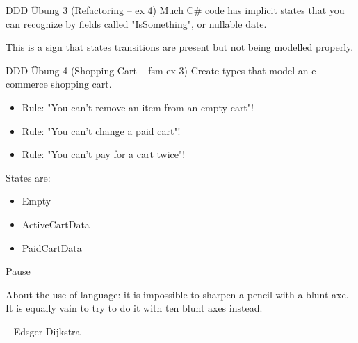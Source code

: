 \documentclass[t]{beamer}
\begin{document}
\begin{frame}[label={sec:org41669ae}]{DDD Übung 3 (Refactoring -- ex 4)}
Much C\# code has implicit states that you can recognize by fields called "IsSomething", or nullable date.

This is a sign that states transitions are present but not being modelled properly.
\end{frame}

\begin{frame}[label={sec:orge2b41b8}]{DDD Übung 4 (Shopping Cart -- fsm ex 3)}
Create types that model an e-commerce shopping cart.

\begin{itemize}
\item Rule: "You can't remove an item from an empty cart"!
\item Rule: "You can't change a paid cart"!
\item Rule: "You can't pay for a cart twice"!
\end{itemize}

States are:
\begin{itemize}
\item Empty
\item ActiveCartData
\item PaidCartData
\end{itemize}
\end{frame}

\begin{frame}[label={sec:org09a213c}]{Pause}
\begin{block}{}
About the use of language: it is impossible to sharpen a pencil with a blunt axe. 
It is equally vain to try to do it with ten blunt axes instead.

\null\hfill -- Edsger Dijkstra
\end{block}
\end{frame}
\end{document}
